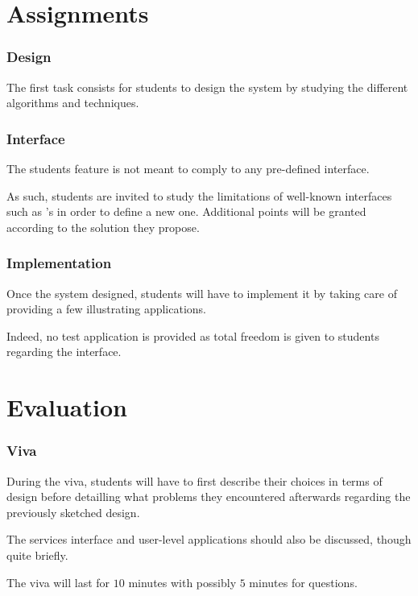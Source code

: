 %
%

\section{Assignments}


\begin{frame}
  \frametitle{Design}

  The first task consists for students to design the system by studying
  the different algorithms and techniques.
\end{frame}


\begin{frame}
  \frametitle{Interface}

  The students feature is not meant to comply to any pre-defined interface.

  \-

  As such, students are invited to study the limitations of well-known
  interfaces such as 's in order to define a new one. Additional
  points will be granted according to the solution they propose.
\end{frame}


\begin{frame}
  \frametitle{Implementation}

  Once the system designed, students will have to implement it by
  taking care of providing a few illustrating applications.

  \-

  Indeed, no test application is provided as total freedom is given to
  students regarding the interface.
\end{frame}

%
%

\section{Evaluation}


\begin{frame}
  \frametitle{Viva}

  During the viva, students will have to first describe their choices in
  terms of design before detailling what problems they encountered afterwards
  regarding the previously sketched design.

  \-

  The services interface and user-level applications should also be discussed,
  though quite briefly.

  \-

  The viva will last for $10$ minutes with possibly $5$ minutes for questions.
\end{frame}

